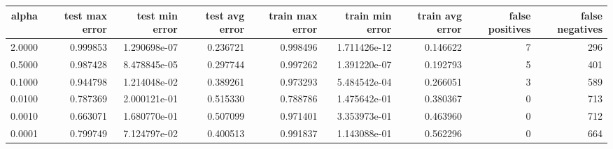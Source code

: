 
\begin{table}[ht]
\tiny
\begin{tabular}{rrrrrrrrr}
\toprule
 alpha &  test max error &  test min error &  test avg error &  train max error &  train min error &  train avg error &  false positives &  false negatives \\
\midrule
2.0000 &        0.999853 &    1.290698e-07 &        0.236721 &         0.998496 &     1.711426e-12 &         0.146622 &                7 &              296 \\
0.5000 &        0.987428 &    8.478845e-05 &        0.297744 &         0.997262 &     1.391220e-07 &         0.192793 &                5 &              401 \\
0.1000 &        0.944798 &    1.214048e-02 &        0.389261 &         0.973293 &     5.484542e-04 &         0.266051 &                3 &              589 \\
0.0100 &        0.787369 &    2.000121e-01 &        0.515330 &         0.788786 &     1.475642e-01 &         0.380367 &                0 &              713 \\
0.0010 &        0.663071 &    1.680770e-01 &        0.507099 &         0.971401 &     3.353973e-01 &         0.463960 &                0 &              712 \\
0.0001 &        0.799749 &    7.124797e-02 &        0.400513 &         0.991837 &     1.143088e-01 &         0.562296 &                0 &              664 \\
\bottomrule
\end{tabular}
\end{table}